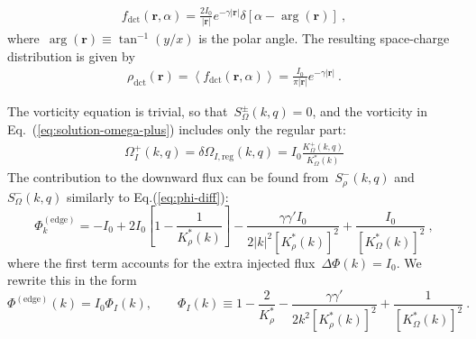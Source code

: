 \documentclass[preprint,aps,eqsecnum, prb]{revtex4-1}
\newcommand{\fplus}[1]{{#1}^{+}}
\newcommand{\fminus}[1]{{#1}^{-}}
\newcommand{\fplusminus}[1]{{#1}^{\pm}}
\newcommand{\dct}[1]{{#1}_\mathrm{dct}}
\begin{document}
\begin{align}
  \label{eq:f-direct}
  \dct{f}({\bm r}, \alpha) = \frac{2I_0}{|{\bm r}|} e^{-\gamma|{\bm r}|}
  \delta \left[\alpha - \arg({\bm r})\right]\ ,
\end{align}
where~$\arg({\bm r}) \equiv \tan^{-1}(y/x)$ is the polar angle.
The resulting space-charge distribution
is given by
\begin{align}
  \label{eq:rho-direct-edge}
  \dct{\rho}({\bm r}) = \left\langle \dct{f}({\bm r}, \alpha) \right\rangle
  = \frac{I_0}{\pi|{\bm r}|} e^{-\gamma |{\bm r}|}\ .
\end{align}

The vorticity equation is trivial, so that~$\fplusminus{S}_\Omega(k, q) = 0$,
and the vorticity in Eq.~(\ref{eq:solution-omega-plus}) includes
only the regular part:
\begin{align}
  \label{eq:iso-omega}
  \fplus{\Omega}_{I}(k, q)
  = \delta\Omega_{I, \mathrm{reg}}(k, q)
  = I_0 \frac{\fplus{K}_\Omega(k, q)}{K_\Omega^\ast(k)}
\end{align}
The contribution to the downward flux can be found from~$\fminus{S}_\rho(k, q)$
and~$\fminus{S}_\Omega(k, q)$ similarly to Eq.(\ref{eq:phi-diff}):
\begin{equation}
  \label{eq:iso-flux-dPhi}
  \Phi^\mathrm{(edge)}_{k} =  -I_0
  + 2 I_0 \left[1 - \frac{1}{K_\rho^\ast(k)}\right]
  - \frac{\gamma \gamma' I_0}{2|k|^2 \left[K_\rho^\ast(k)\right]^2}
  + \frac{I_0}{\left[K_\Omega^\ast(k)\right]^2}
\ ,
\end{equation}
where the first term accounts for
the extra injected flux~$\Delta\Phi(k) = I_0$.
We rewrite this in the form
\begin{equation}
  \label{eq:phi-iso-surf}
  \Phi^\mathrm{(edge)}(k) =
  I_0 \Phi_I(k), \qquad
  \Phi_I(k) \equiv 1  - \frac{2}{K_\rho^\ast}
    - \frac{\gamma \gamma'}{2k^2 \left[K_\rho^\ast(k)\right]^2}
    + \frac{1}{\left[K_\Omega^\ast(k)\right]^2} \ .
\end{equation}
%
\end{document}
